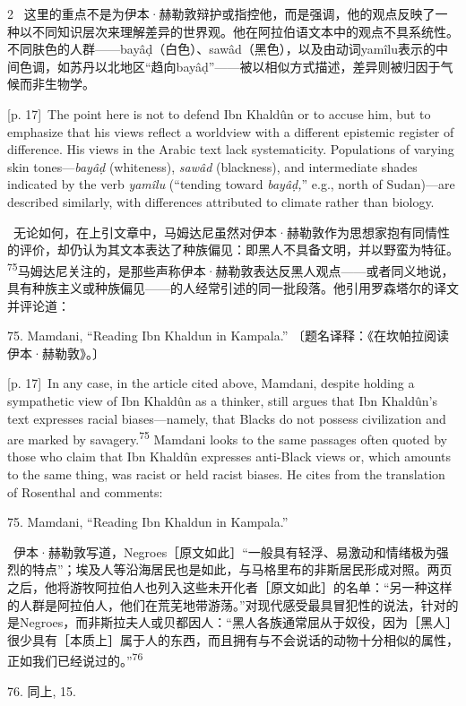 \documentclass[10pt,a4paper]{article}
\begin{document}
\begin{paracol}{2}
\switchcolumn*
{\scriptsize\color{gray} [p. 17]}\ 这里的重点不是为伊本·赫勒敦辩护或指控他，而是强调，他的观点反映了一种以不同知识层次来理解差异的世界观。他在阿拉伯语文本中的观点不具系统性。不同肤色的人群——bayâḍ（白色）、sawâd（黑色），以及由动词yamîlu表示的中间色调，如苏丹以北地区“趋向bayâḍ”——被以相似方式描述，差异则被归因于气候而非生物学。\par
\switchcolumn
{\scriptsize\color{gray} [p. 17]}\ The point here is not to defend Ibn Khaldûn or to accuse him, but to emphasize that his views reflect a worldview with a different epistemic register of difference. His views in the Arabic text lack systematicity. Populations of varying skin tones—\textit{bayâḍ} (whiteness), \textit{sawâd} (blackness), and intermediate shades indicated by the verb \textit{yamîlu} (“tending toward \textit{bayâḍ,}” e.g., north of Sudan)—are described similarly, with differences attributed to climate rather than biology.\par
\switchcolumn*
{\scriptsize\color{gray} [p. 17]}\ 无论如何，在上引文章中，马姆达尼虽然对伊本·赫勒敦作为思想家抱有同情性的评价，却仍认为其文本表达了种族偏见：即黑人不具备文明，并以野蛮为特\mbox{征。\textsuperscript{75}}马姆达尼关注的，是那些声称伊本·赫勒敦表达反黑人观点——或者同义地说，具有种族主义或种族偏见——的人经常引述的同一批段落。他引用罗森塔尔的译文并评论道：\par{\small 75. Mamdani, “Reading Ibn Khaldun in Kampala.” 〔题名译释：《在坎帕拉阅读伊本·赫勒敦》。〕\par}
\switchcolumn
{\scriptsize\color{gray} [p. 17]}\ In any case, in the article cited above, Mamdani, despite holding a sympathetic view of Ibn Khaldûn as a thinker, still argues that Ibn Khaldûn’s text expresses racial biases—namely, that Blacks do not possess civilization and are marked by savagery.\nobreak\textsuperscript{75} Mamdani looks to the same passages often quoted by those who claim that Ibn Khaldûn expresses anti-Black views or, which amounts to the same thing, was racist or held racist biases. He cites from the translation of Rosenthal and comments:\par{\small 75. Mamdani, “Reading Ibn Khaldun in Kampala.”\par}
\switchcolumn*
{\scriptsize\color{gray} [p. 18]}\ 伊本·赫勒敦写道，Negroes［原文如此］“一般具有轻浮、易激动和情绪极为强烈的特点”；埃及人等沿海居民也是如此，与马格里布的非斯居民形成对照。两页之后，他将游牧阿拉伯人也列入这些未开化者［原文如此］的名单：“另一种这样的人群是阿拉伯人，他们在荒芜地带游荡。”对现代感受最具冒犯性的说法，针对的是Negroes，而非斯拉夫人或贝都因人：“黑人各族通常屈从于奴役，因为［黑人］很少具有［本质上］属于人的东西，而且拥有与不会说话的动物十分相似的属性，正如我们已经说过的。”\nobreak\textsuperscript{76}\par{\small 76. 同上, 15.\par}

\end{paracol}
\end{document}

